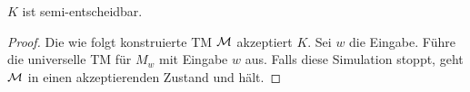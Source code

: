\begin{lemma}[name={[$K$ ist semi-entscheidbar]}]\label{lemma:Ksemi-entscheidbar}
	$K$ ist semi-entscheidbar.
\end{lemma}
\begin{proof}
  Die wie folgt konstruierte \ac{TM} $\mathcal{M}$ akzeptiert $K$.
  Sei $w$ die Eingabe. 
  Führe die universelle \ac{TM} für $M_w$ mit Eingabe $w$ aus.
  Falls diese Simulation stoppt, geht $\mathcal{M}$ in einen akzeptierenden Zustand und hält.
\end{proof}
